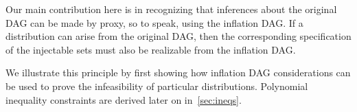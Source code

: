 Our main contribution here is in recognizing that inferences about the original DAG can be made by proxy, so to speak, using the inflation DAG. If a distribution can arise from the original DAG, then the corresponding specification of the injectable sets must also be realizable from the inflation DAG. 

We illustrate this principle by first showing how inflation DAG considerations can be used to prove the infeasibility of particular distributions. Polynomial inequality constraints are derived later on in~\cref{sec:ineqs}.



\par\smallskip\nobreak

